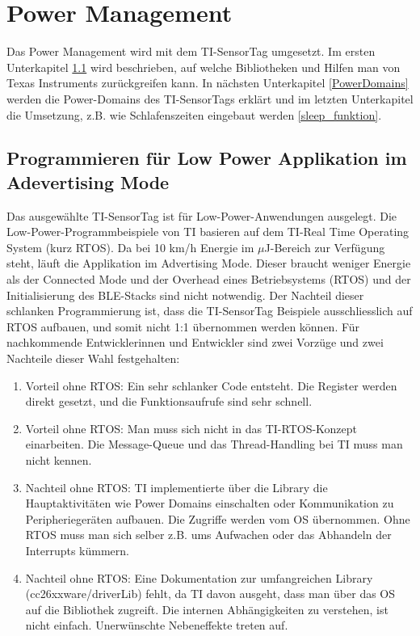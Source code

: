 \section{Power Management}
\label{powerOptimierung}

Das Power Management wird mit dem TI-SensorTag umgesetzt. Im ersten Unterkapitel \ref{keinROTS} wird beschrieben, auf welche Bibliotheken und Hilfen man von Texas Instruments zurückgreifen kann. In nächsten Unterkapitel \ref{PowerDomains} werden die Power-Domains des TI-SensorTags erklärt und im letzten Unterkapitel die Umsetzung, z.B. wie Schlafenszeiten eingebaut werden \ref{sleep_funktion}.


\subsection{Programmieren für Low Power Applikation im Adevertising Mode}
\label{keinROTS}

Das ausgewählte TI-SensorTag ist für Low-Power-Anwendungen ausgelegt. Die Low-Power-Programmbeispiele von TI basieren auf dem TI-Real Time Operating System (kurz RTOS). Da bei 10 km/h Energie im $\mu$J-Bereich zur Verfügung steht, läuft die Applikation im Advertising Mode. Dieser braucht weniger Energie als der Connected Mode und der Overhead eines Betriebsystems (RTOS) und der Initialisierung des BLE-Stacks sind nicht notwendig. Der Nachteil dieser schlanken Programmierung ist, dass die TI-SensorTag Beispiele ausschliesslich auf RTOS aufbauen, und somit nicht 1:1 übernommen werden können. Für nachkommende Entwicklerinnen und Entwickler sind zwei Vorzüge und zwei Nachteile dieser Wahl festgehalten:

\begin{minipage}{1\textwidth}
    \begin{enumerate}
        \item Vorteil ohne RTOS: Ein sehr schlanker Code entsteht. Die Register werden direkt gesetzt, und die Funktionsaufrufe sind sehr schnell.
        \item Vorteil ohne RTOS: Man muss sich nicht in das TI-RTOS-Konzept einarbeiten. Die Message-Queue und das Thread-Handling bei TI muss man nicht kennen.
        \item Nachteil ohne RTOS: TI implementierte über die Library die Hauptaktivitäten wie Power Domains einschalten oder Kommunikation zu Peripheriegeräten aufbauen. Die Zugriffe werden vom OS übernommen. Ohne RTOS muss man sich selber z.B. ums Aufwachen oder das Abhandeln der Interrupts kümmern.        
       \item Nachteil ohne RTOS: Eine Dokumentation zur umfangreichen Library (cc26xxware/driverLib) fehlt, da TI davon ausgeht, dass man über das OS auf die Bibliothek zugreift. Die internen Abhängigkeiten zu verstehen, ist nicht einfach. Unerwünschte Nebeneffekte treten auf.
    \end{enumerate}
\end{minipage}

